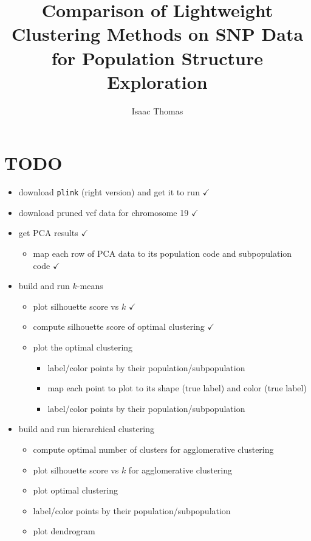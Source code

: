 \documentclass[letterpaper]{article}
\title{Comparison of Lightweight Clustering Methods on SNP Data for Population Structure Exploration}
\author{Isaac Thomas}
\newcommand{\code}[1]{\texttt{#1}}
\theoremstyle{definition}
\begin{document}
\maketitle

\section{TODO}
\begin{itemize}
    \item download \code{plink} (right version) and get it to run $\checkmark$
    \item download pruned vcf data for chromosome 19 $\checkmark$
    \item get PCA results $\checkmark$
        \begin{itemize}
            \item map each row of PCA data to its population code and subpopulation code $\checkmark$
        \end{itemize}
    \item build and run $k$-means
    \begin{itemize}
        \item plot silhouette score vs $k$ $\checkmark$
        \item compute silhouette score of optimal clustering $\checkmark$
        \item plot the optimal clustering
        \begin{itemize}
            \item label/color points by their population/subpopulation
            \item map each point to plot to its shape (true label) and color (true label)
            \item label/color points by their population/subpopulation
        \end{itemize}
    \end{itemize}
    \item build and run hierarchical clustering
    \begin{itemize}
        \item compute optimal number of clusters for agglomerative clustering
        \item plot silhouette score vs $k$ for agglomerative clustering
        \item plot optimal clustering
        \item label/color points by their population/subpopulation
        \item plot dendrogram
    \end{itemize}

\end{itemize}
\end{document}
